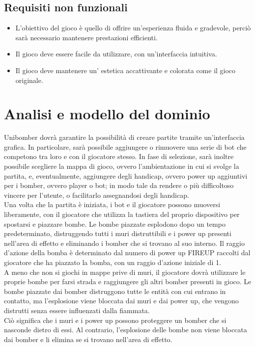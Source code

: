 \documentclass[a4paper,12pt]{report}
\begin{document}
\subsection*{Requisiti non funzionali}
\begin{itemize}
    \item L'obiettivo del gioco è quello di offrire un'esperienza fluida e gradevole, perciò sarà necessario mantenere prestazioni efficienti.
    \item Il gioco deve essere facile da utilizzare, con un'interfaccia intuitiva.
    \item Il gioco deve mantenere un’ estetica accattivante e colorata come il gioco originale.
\end{itemize}
\newpage
\section{Analisi e modello del dominio}
Unibomber dovrà garantire la possibilità di creare partite tramite un'interfaccia grafica. In particolare, sarà possibile aggiungere o rimuovere una serie di bot che competono tra loro e con il giocatore stesso. In fase di selezione, sarà inoltre possibile scegliere la mappa di gioco, ovvero l'ambientazione in cui si svolge la partita, e, eventualmente, aggiungere degli handicap, ovvero power up aggiuntivi per i bomber, ovvero player o bot; in modo tale da rendere o più difficoltoso vincere per l’utente, o facilitarlo assegnandosi degli handicap.
\\
Una volta che la partita è iniziata, i bot e il giocatore possono muoversi liberamente, con il giocatore che utilizza la tastiera del proprio dispositivo per spostarsi e piazzare bombe.
Le bombe piazzate esplodono dopo un tempo predeterminato, distruggendo tutti i muri distruttibili e i power up presenti nell'area di effetto e eliminando i bomber che si trovano al suo interno. Il raggio d'azione della bomba è determinato dal numero di power up FIREUP raccolti dal giocatore che ha piazzato la bomba, con un raggio d'azione iniziale di 1.
\\
A meno che non si giochi in mappe prive di muri, il giocatore dovrà utilizzare le proprie bombe per farsi strada e raggiungere gli altri bomber presenti in gioco. Le bombe piazzate dai bomber distruggono tutte le entità con cui entrano in contatto, ma l'esplosione viene bloccata dai muri e dai power up, che vengono distrutti senza essere influenzati dalla fiammata.
\\
Ciò significa che i muri e i power up possono proteggere un bomber che si nasconde dietro di essi. Al contrario, l'esplosione delle bombe non viene bloccata dai bomber e li elimina se si trovano nell'area di effetto.
\end{document}
